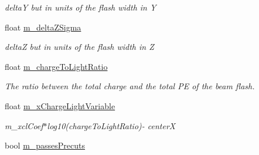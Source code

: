 \begin{DoxyCompactItemize}
\begin{DoxyCompactList}\small\item\em delta\-Y but in units of the flash width in Y \end{DoxyCompactList}\item 
\hypertarget{classflashmatch_1_1FlashMatchingTool_1_1SliceCandidate_a9a4925e9509aefece6d65e7aecd21364}{float \hyperlink{classflashmatch_1_1FlashMatchingTool_1_1SliceCandidate_a9a4925e9509aefece6d65e7aecd21364}{m\-\_\-delta\-Z\-Sigma}}\label{classflashmatch_1_1FlashMatchingTool_1_1SliceCandidate_a9a4925e9509aefece6d65e7aecd21364}

\begin{DoxyCompactList}\small\item\em delta\-Z but in units of the flash width in Z \end{DoxyCompactList}\item 
\hypertarget{classflashmatch_1_1FlashMatchingTool_1_1SliceCandidate_a1b4fb1f44be1a50c340b146d41af0a4d}{float \hyperlink{classflashmatch_1_1FlashMatchingTool_1_1SliceCandidate_a1b4fb1f44be1a50c340b146d41af0a4d}{m\-\_\-charge\-To\-Light\-Ratio}}\label{classflashmatch_1_1FlashMatchingTool_1_1SliceCandidate_a1b4fb1f44be1a50c340b146d41af0a4d}

\begin{DoxyCompactList}\small\item\em The ratio between the total charge and the total P\-E of the beam flash. \end{DoxyCompactList}\item 
\hypertarget{classflashmatch_1_1FlashMatchingTool_1_1SliceCandidate_ad6389ab7c945c5fa2a00798eeff843a5}{float \hyperlink{classflashmatch_1_1FlashMatchingTool_1_1SliceCandidate_ad6389ab7c945c5fa2a00798eeff843a5}{m\-\_\-x\-Charge\-Light\-Variable}}\label{classflashmatch_1_1FlashMatchingTool_1_1SliceCandidate_ad6389ab7c945c5fa2a00798eeff843a5}

\begin{DoxyCompactList}\small\item\em m\-\_\-xcl\-Coef$\ast$log10(charge\-To\-Light\-Ratio)-\/ center\-X \end{DoxyCompactList}\item 
\hypertarget{classflashmatch_1_1FlashMatchingTool_1_1SliceCandidate_a941b9bda87553ae119e5372943be4e8f}{bool \hyperlink{classflashmatch_1_1FlashMatchingTool_1_1SliceCandidate_a941b9bda87553ae119e5372943be4e8f}{m\-\_\-passes\-Precuts}}\label{classflashmatch_1_1FlashMatchingTool_1_1SliceCandidate_a941b9bda87553ae119e5372943be4e8f}


\end{DoxyCompactItemize}
